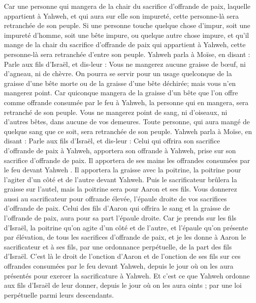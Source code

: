 \begin{multicols}{2}
Car une personne qui mangera de la chair du sacrifice d'offrande de paix, laquelle appartient à Yahweh, et qui aura sur elle son impureté, cette personne-là sera retranchée de son peuple.
Si une personne touche quelque chose d'impur, soit une impureté d'homme, soit une bête impure, ou quelque autre chose impure, et qu'il mange de la chair du sacrifice d'offrande de paix qui appartient à Yahweh, cette personne-là sera retranchée d'entre son peuple.
Yahweh parla à Moïse, en disant :
Parle aux fils d'Israël, et dis-leur : Vous ne mangerez aucune graisse de bœuf, ni d'agneau, ni de chèvre.
On pourra se servir pour un usage quelconque de la graisse d'une bête morte ou de la graisse d'une bête déchirée; mais vous n'en mangerez point.
Car quiconque mangera de la graisse d'un bête que l'on offre comme offrande consumée par le feu à Yahweh, la personne qui en mangera, sera retranché de son peuple.
Vous ne mangerez point de sang, ni d'oiseaux, ni d'autres bêtes, dans aucune de vos demeures.
Toute personne, qui aura mangé de quelque sang que ce soit, sera retranchée de son peuple.
Yahweh parla à Moïse, en disant :
Parle aux fils d'Israël, et dis-leur : Celui qui offrira son sacrifice d'offrande de paix à Yahweh, apportera son offrande à Yahweh, prise sur son sacrifice d'offrande de paix.
Il apportera de ses mains les offrandes consumées par le feu devant Yahweh . Il apportera la graisse avec la poitrine, la poitrine pour l'agiter d'un côté et de l'autre devant Yahweh.
Puis le sacrificateur brûlera la graisse sur l'autel, mais la poitrine sera pour Aaron et ses fils.
Vous donnerez aussi au sacrificateur pour offrande élevée, l'épaule droite de vos sacrifices d'offrande de paix.
Celui des fils d'Aaron qui offrira le sang et la graisse de l'offrande de paix, aura pour sa part l'épaule droite.
Car je prends sur les fils d'Israël, la poitrine qu'on agite d'un côté et de l'autre, et l'épaule qu'on présente par élévation, de tous les sacrifices d'offrande de paix, et je les donne à Aaron le sacrificateur et à ses fils, par une ordonnance perpétuelle, de la part des fils d'Israël.
C'est là le droit de l'onction d'Aaron et de l'onction de ses fils sur ces offrandes consumées par le feu devant Yahweh, depuis le jour où on les aura présentés pour exercer la sacrificature à Yahweh.
Et c'est ce que Yahweh ordonne aux fils d'Israël de leur donner, depuis le jour où on les aura oints ; par une loi perpétuelle parmi leurs descendants.

\end{multicols}
